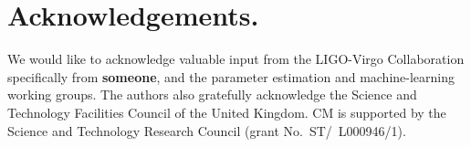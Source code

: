 \documentclass[%
showpacs,
 amsmath,amssymb,
 aps,
 twocolumn,
 prl,
 reprint,
floatfix,
]{revtex4-1}
\begin{document}
%
%
\section{Acknowledgements.}
%
We would like to acknowledge valuable input from the LIGO-Virgo Collaboration
specifically from {\textbf{someone}}, and the parameter estimation and
machine-learning working groups. The authors also gratefully acknowledge the
Science and Technology Facilities Council of the United Kingdom. CM is
supported by the Science and Technology Research Council (grant
No.~ST/~L000946/1).




\end{document}
